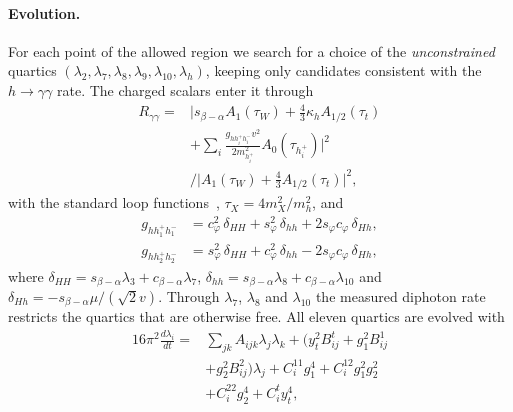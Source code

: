 \documentclass[twocolumn,epjc3]{svjour3}
\begin{document}
\paragraph{Evolution.} For each point of the allowed region we search for a choice of the \emph{unconstrained} quartics $(\lambda_2,\lambda_7,\lambda_8,\lambda_9,\lambda_{10},\lambda_h)$, keeping only candidates consistent with the $h\to\gamma\gamma$ rate. The charged scalars enter it through
\begin{equation}
\begin{split}R_{\gamma\gamma}={}&\Big|s_{\beta-\alpha}A_1(\tau_W)+\tfrac43\kappa_hA_{1/2}(\tau_t)\\&+\sum_i\frac{g_{hh_i^+h_i^-}v^2}{2m^2_{h_i^+}}A_0(\tau_{h_i^+})\Big|^2\\&\Big/\Big|A_1(\tau_W)+\tfrac43A_{1/2}(\tau_t)\Big|^2,\end{split}
\end{equation}
with the standard loop functions~\cite{Djouadi:2005gj}, $\tau_X=4m_X^2/m_h^2$, and
\begin{align}
g_{hh_1^+h_1^-}&=c_\varphi^2\,\delta_{HH}+s_\varphi^2\,\delta_{hh}+2s_\varphi c_\varphi\,\delta_{Hh},\nonumber\\
g_{hh_2^+h_2^-}&=s_\varphi^2\,\delta_{HH}+c_\varphi^2\,\delta_{hh}-2s_\varphi c_\varphi\,\delta_{Hh},
\end{align}
where $\delta_{HH}=s_{\beta-\alpha}\lambda_3+c_{\beta-\alpha}\lambda_7$, $\delta_{hh}=s_{\beta-\alpha}\lambda_8+c_{\beta-\alpha}\lambda_{10}$ and $\delta_{Hh}=-s_{\beta-\alpha}\mu/(\sqrt2v)$. Through $\lambda_7$, $\lambda_8$ and $\lambda_{10}$ the measured diphoton rate restricts the quartics that are otherwise free. All eleven quartics are evolved with
\begin{equation}
\begin{split}16\pi^2\frac{d\lambda_i}{dt}={}&\sum_{jk}A_{ijk}\lambda_j\lambda_k+\big(y_t^2B^{t}_{ij}+g_1^2B^{1}_{ij}\\&+g_2^2B^{2}_{ij}\big)\lambda_j+C^{11}_ig_1^4+C^{12}_ig_1^2g_2^2\\&+C^{22}_ig_2^4+C^t_iy_t^4,\end{split}
\end{equation}
\end{document}
